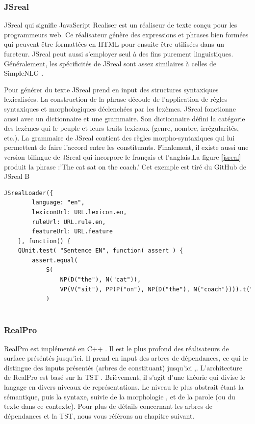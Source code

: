 \subsubsection{JSreal}
JSreal \citep{DaoustJSREALTextRealizer2015} qui signifie JavaScript Realiser est un réaliseur de texte conçu pour les programmeurs web. Ce réalisateur génère des expressions et phrases bien formées qui peuvent être formattées en HTML pour ensuite être utilisées dans un fureteur. JSreal peut aussi s'employer seul à des fins purement linguistiques. Généralement, les spécificités de JSreal sont assez similaires à celles de SimpleNLG \citep{GattSimpleNLGRealisationEngine2009}.

Pour générer du texte JSreal prend en input des structures syntaxiques lexicalisées. La construction de la phrase découle de l'application de règles syntaxiques et morphologiques déclenchées par les lexèmes. JSreal fonctionne aussi avec un dictionnaire et une grammaire. Son dictionnaire défini la catégorie des lexèmes qui le peuple et leurs traits lexicaux (genre, nombre, irrégularités, etc.). La grammaire de JSreal contient des règles morpho-syntaxiques qui lui permettent de faire l'accord entre les constituants. Finalement, il existe aussi une version bilingue de JSreal \citep{MolinsJSrealBBilingualText2015} qui incorpore le français et l'anglais.La figure \ref{jsreal} produit la phrase :'The cat sat on the coach.' Cet exemple est tiré du GitHub de JSreal B

\begin{lstlisting}[language=Xml, caption=JSreal, label=jsreal]
JSrealLoader({
        language: "en",
        lexiconUrl: URL.lexicon.en,
        ruleUrl: URL.rule.en,
        featureUrl: URL.feature
    }, function() {
    QUnit.test( "Sentence EN", function( assert ) {
        assert.equal(
            S(
                NP(D("the"), N("cat")),
                VP(V("sit"), PP(P("on"), NP(D("the"), N("coach")))).t("ps")
            )
        
\end{lstlisting}
		
\subsubsection{RealPro}
RealPro est implémenté en C++ \citep{LavoieFastPortableRealizer1997}. Il est le plus profond des réalisateurs de surface préséntés jusqu'ici. Il prend en input des arbres de dépendances, ce qui le distingue des inputs présentés (arbres de constituant) jusqu'ici \citep{DaoustJSREALTextRealizer2015},\citep{GattSimpleNLGRealisationEngine2009}. L'architecture de RealPro est basé sur la TST \citep{melcuk1988}. Brièvement, il s'agit d'une théorie qui divise le langage en divers niveaux de représentations. Le niveau le plus abstrait étant la sémantique, puis la syntaxe,  suivie de la morphologie , et de la parole (ou du texte dans ce contexte). Pour plus de détails concernant les arbres de dépendances et la TST, nous vous référons au chapitre suivant.


